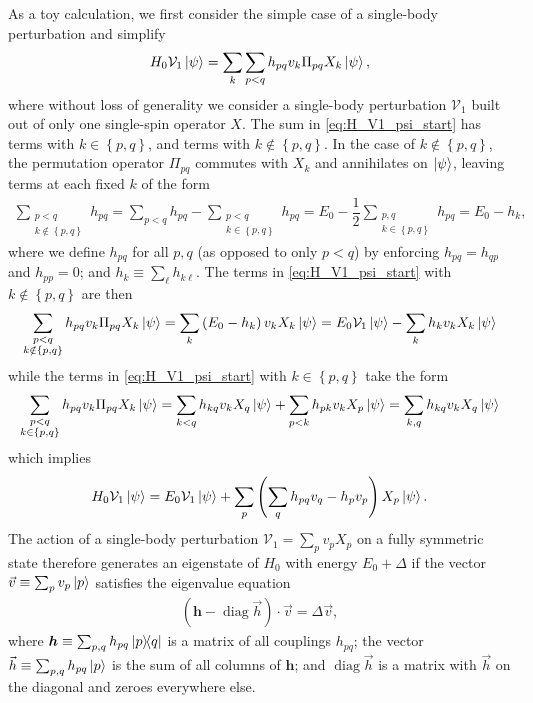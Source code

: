 \documentclass[nofootinbib,notitlepage,11pt]{revtex4-2}
\newcommand{\f}[2]{\dfrac{#1}{#2}} %
\newcommand{\p}[1]{\left(#1\right)} %
\renewcommand{\set}[1]{\left\{#1\right\}} %
\renewcommand{\c}{\cdot} %
\newcommand{\m}{\bm} %
\renewcommand{\v}{\vec} %
\newcommand{\1}{\mathds{1}}
\newcommand{\V}{\mathcal{V}}
\DeclareMathOperator{\diag}{diag}
\begin{document}
As a toy calculation, we first consider the simple case of a
single-body perturbation and simplify
\begin{align}
  H_0 \V_1 \ket\psi
  = \sum_k \sum_{p<q} h_{pq} v_k \Pi_{pq} X_k \ket\psi,
  \label{eq:H_V1_psi_start}
\end{align}
where without loss of generality we consider a single-body
perturbation $\V_1$ built out of only one single-spin operator $X$.
The sum in \eqref{eq:H_V1_psi_start} has terms with $k\in\set{p,q}$,
and terms with $k\notin\set{p,q}$.  In the case of $k\notin\set{p,q}$,
the permutation operator $\Pi_{pq}$ commutes with $X_k$ and
annihilates on $\ket\psi$, leaving terms at each fixed $k$ of the form
\begin{align}
  \sum_{\substack{p<q\\k\notin\set{p,q}}} h_{pq}
  = \sum_{p<q} h_{pq} - \sum_{\substack{p<q\\k\in\set{p,q}}} h_{pq}
  = E_0 - \f12 \sum_{\substack{p,q\\k\in\set{p,q}}} h_{pq}
  = E_0 - h_k,
\end{align}
where we define $h_{pq}$ for all $p,q$ (as opposed to only $p<q$) by
enforcing $h_{pq}=h_{qp}$ and $h_{pp}=0$; and
$h_k \equiv \sum_\ell h_{k\ell}$.  The terms in
\eqref{eq:H_V1_psi_start} with $k\notin\set{p,q}$ are then
\begin{align}
  \sum_{\substack{p<q\\k\notin\set{p,q}}}
  h_{pq} v_k \Pi_{pq} X_k \ket\psi
  = \sum_k \p{E_0 - h_k} v_k X_k \ket\psi
  = E_0 \V_1 \ket\psi - \sum_k h_k v_k X_k \ket\psi
\end{align}
while the terms in \eqref{eq:H_V1_psi_start} with $k\in\set{p,q}$ take
the form
\begin{align}
  \sum_{\substack{p<q\\k\in\set{p,q}}}
  h_{pq} v_k \Pi_{pq} X_k \ket\psi
  = \sum_{k<q} h_{kq} v_k X_q \ket\psi
  + \sum_{p<k} h_{pk} v_k X_p \ket\psi
  = \sum_{k,q} h_{kq} v_k X_q \ket\psi
\end{align}
which implies
\begin{align}
  H_0 \V_1 \ket\psi
  = E_0 \V_1 \ket\psi
  + \sum_p \p{\sum_{q} h_{pq} v_q - h_p v_p}
  X_p \ket\psi.
  \label{eq:H_V1_psi_end}
\end{align}
The action of a single-body perturbation $\V_1=\sum_p v_p X_p$ on a
fully symmetric state therefore generates an eigenstate of $H_0$ with
energy $E_0+\Delta$ if the vector $\v v\equiv\sum_p v_p\ket{p}$
satisfies the eigenvalue equation
\begin{align}
  \p{\m h - \diag\v h} \c \v v = \Delta \v v,
  \label{eq:H_V1_psi_eig}
\end{align}
where $\m h\equiv\sum_{p,q}h_{pq}\op{p}{q}$ is a matrix of all
couplings $h_{pq}$; the vector $\v h\equiv\sum_{p,q}h_{pq}\ket{p}$ is
the sum of all columns of $\m h$; and $\diag\v h$ is a matrix with
$\v h$ on the diagonal and zeroes everywhere else.
\end{document}
